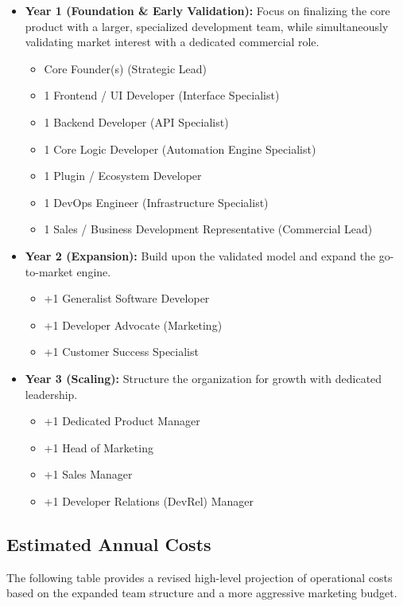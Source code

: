 \begin{itemize}
    \item \textbf{Year 1 (Foundation \& Early Validation):} Focus on finalizing the core product with a larger, specialized development team, while simultaneously validating market interest with a dedicated commercial role.
    \begin{itemize}
        \item Core Founder(s) (Strategic Lead)
        \item 1 Frontend / UI Developer (Interface Specialist)
        \item 1 Backend Developer (API Specialist)
        \item 1 Core Logic Developer (Automation Engine Specialist)
        \item 1 Plugin / Ecosystem Developer
        \item 1 DevOps Engineer (Infrastructure Specialist)
        \item 1 Sales / Business Development Representative (Commercial Lead)
    \end{itemize}
    \item \textbf{Year 2 (Expansion):} Build upon the validated model and expand the go-to-market engine.
    \begin{itemize}
        \item +1 Generalist Software Developer
        \item +1 Developer Advocate (Marketing)
        \item +1 Customer Success Specialist
    \end{itemize}
    \item \textbf{Year 3 (Scaling):} Structure the organization for growth with dedicated leadership.
    \begin{itemize}
        \item +1 Dedicated Product Manager
        \item +1 Head of Marketing
        \item +1 Sales Manager
        \item +1 Developer Relations (DevRel) Manager
    \end{itemize}
\end{itemize}

\subsection*{Estimated Annual Costs}
The following table provides a revised high-level projection of operational costs based on the expanded team structure and a more aggressive marketing budget.

